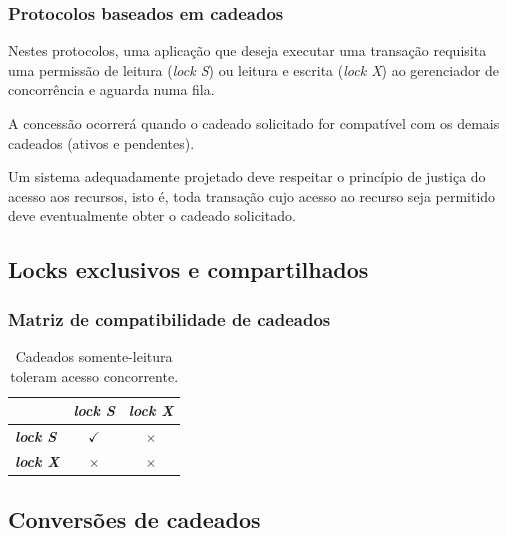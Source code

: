 \documentclass{beamer}
\begin{document}
\begin{frame}        
    \frametitle{Protocolos baseados em cadeados}

    Nestes protocolos, uma aplicação que deseja executar uma transação requisita uma permissão de leitura (\emph{lock S}) ou leitura e escrita (\emph{lock X}) ao gerenciador de concorrência e aguarda numa fila.

    \medskip
        
    A concessão ocorrerá quando o cadeado solicitado for compatível com os demais cadeados (ativos e pendentes).

    \medskip

    Um sistema adequadamente projetado deve respeitar o princípio de justiça do acesso aos recursos, isto é, toda transação cujo acesso ao recurso seja permitido deve eventualmente obter o cadeado solicitado. 
\end{frame}


\subsection{Locks exclusivos e compartilhados}

\begin{frame}
    \frametitle{Matriz de compatibilidade de cadeados}
    
    \begin{table}
    \begin{tabular}{l c c}
        \toprule

        \textbf{} & \textbf{\emph{lock S}} & \textbf{\emph{lock X}}\\

        \midrule

        \textbf{\emph{lock S}} & $\checkmark$ & $\times$ \\
        \textbf{\emph{lock X}} & $\times$ & $\times$ \\

        \bottomrule
    \end{tabular}
    \caption{Cadeados somente-leitura toleram acesso concorrente.}
    \end{table}
\end{frame}


\subsection{Conversões de cadeados} %
\end{document}

